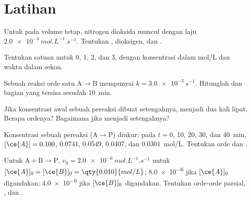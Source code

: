 \section{Latihan}

\begin{exercise}[$\star$]\label{exo:b1:rate-laws:1}
Untuk  pada volume tetap, nitrogen dioksida muncul
dengan laju $\qty{2.0e-4}{mol.L^{-1}.s^{-1}}$. Tentukan ,  dioksigen, dan  .
\end{exercise}

\begin{exercise}[$\star$]\label{exo:b1:rate-laws:2}
Tentukan satuan  untuk  0, 1, 2, dan 3, dengan
konsentrasi dalam \unit{mol/L} dan waktu dalam sekon.
\end{exercise}

\begin{exercise}[$\star$]\label{exo:b1:rate-laws:3}
Sebuah reaksi orde satu $\mathrm{A} \longrightarrow \mathrm{B}$ mempunyai $k = \qty{3.0e-3}{s^{-1}}$. Hitunglah
 dan bagian  yang tersisa sesudah \qty{10}{min}.
\end{exercise}

\begin{exercise}[$\star$]\label{exo:b1:rate-laws:4}
Jika konsentrasi awal sebuah pereaksi dibuat setengahnya, 
menjadi dua kali lipat. Berapa ordenya? Bagaimana jika 
menjadi setengahnya?
\end{exercise}

\begin{exercise}[$\star\star$]\label{exo:b1:rate-laws:5}
Konsentrasi sebuah pereaksi  ($\mathrm{A} \longrightarrow \mathrm{P}$) diukur: pada $t
= 0$, 10, 20, 30, dan \qty{40}{min}, $[\ce{A}] = 0.100$, 0.0741, 0.0549,
0.0407, dan \qty{0.0301}{mol/L}. Tentukan orde dan .
\end{exercise}

\begin{exercise}[$\star\star$]\label{exo:b1:rate-laws:6}
Untuk $\mathrm{A} + \mathrm{B} \longrightarrow \mathrm{P}$, $v_0 = \qty{2.0e-6}{mol.L^{-1}.s^{-1}}$ untuk $[\ce{A}]_0
= [\ce{B}]_0 = \qty{0.010}{mol/L}$; \qty{8.0e-6}{} jika $[\ce{A}]_0$
digandakan; \qty{4.0e-6}{} jika $[\ce{B}]_0$ digandakan. Tentukan
orde-orde parsial, , dan .
\end{exercise}

